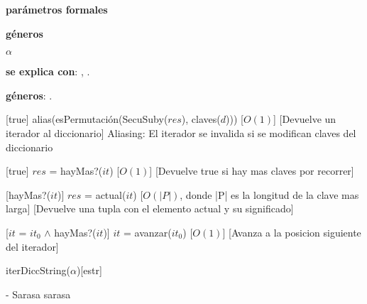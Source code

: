 
\begin{Interfaz}

  \textbf{par\'ametros formales}\parindent\\
  \parbox{1.7cm}{\textbf{g\'eneros}} $\alpha$
 
 
  \textbf{se explica con}: , .

  \textbf{g\'eneros}: .


%
[true]
{alias(esPermutaci\'on(SecuSuby($res$), claves($d$)))}%
[$O(1)$] %
[Devuelve un iterador al diccionario]
{Aliasing: El iterador se invalida si se modifican claves del diccionario}

%
[true]
{$res$ = hayMas?($it$)}%
[$O(1)$]
[Devuelve true si hay mas claves por recorrer]

%
[hayMas?($it$)]
{$res$ = actual($it$)}%
[$O(|P|)$, donde |P| es la longitud de la clave mas larga]
[Devuelve una tupla con el elemento actual y su significado]

%
[$it$ = $it_0$ $\land$ hayMas?($it$)]
{$it$ = avanzar($it_0$)}%
[$O(1)$]
[Avanza a la posicion siguiente del iterador]



\end{Interfaz}

\pagebreak

\begin{Representacion}
  
  
  \begin{Estructura}{iterDiccString($\alpha$)}[estr]
    \begin{Tupla}[estr]
    \end{Tupla}
  \end{Estructura}



- Sarasa sarasa

%
%

\end{Representacion}

